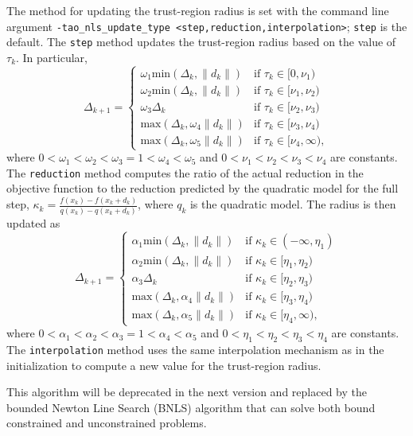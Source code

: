 \documentclass[]{book}
\begin{document}
The method for updating the trust-region radius is set with the 
command line argument 
{\tt -tao\_nls\_update\_type <step,reduction,interpolation>}; {\tt step} 
is the default.  The {\tt step} method updates the trust-region 
radius based on the value of $\tau_k$.  In particular,
\[
\Delta_{k+1} = \left\{\begin{array}{ll}
\omega_1 \mbox{min}(\Delta_k, \|d_k\|) & \mbox{if } \tau_k \in [0, \nu_1) \\
\omega_2 \mbox{min}(\Delta_k, \|d_k\|) & \mbox{if } \tau_k \in [\nu_1, \nu_2) \\
\omega_3 \Delta_k & \mbox{if } \tau_k \in [\nu_2, \nu_3) \\
\mbox{max}(\Delta_k, \omega_4 \|d_k\|) & \mbox{if } \tau_k \in [\nu_3, \nu_4) \\
\mbox{max}(\Delta_k, \omega_5 \|d_k\|) & \mbox{if } \tau_k \in [\nu_4, \infty),
\end{array}
\right.
\]
where $0 < \omega_1 < \omega_2 < \omega_3 = 1 < \omega_4 < \omega_5$ and
$0 < \nu_1 < \nu_2 < \nu_3 < \nu_4$ are constants.  The {\tt reduction} 
method computes the ratio of the actual reduction in the objective function 
to the reduction predicted by the quadratic model for the full step, 
$\kappa_k = \frac{f(x_k) - f(x_k + d_k)}{q(x_k) - q(x_k + d_k)}$, where 
$q_k$ is the quadratic model.  The radius is then updated as
\[
\Delta_{k+1} = \left\{\begin{array}{ll}
\alpha_1 \mbox{min}(\Delta_k, \|d_k\|) & \mbox{if } \kappa_k \in (-\infty, \eta_1) \\
\alpha_2 \mbox{min}(\Delta_k, \|d_k\|) & \mbox{if } \kappa_k \in [\eta_1, \eta_2) \\
\alpha_3 \Delta_k & \mbox{if } \kappa_k \in [\eta_2, \eta_3) \\
\mbox{max}(\Delta_k, \alpha_4 \|d_k\|) & \mbox{if } \kappa_k \in [\eta_3, \eta_4) \\
\mbox{max}(\Delta_k, \alpha_5 \|d_k\|) & \mbox{if } \kappa_k \in [\eta_4, \infty),
\end{array}
\right.
\]
where $0 < \alpha_1 < \alpha_2 < \alpha_3 = 1 < \alpha_4 < \alpha_5$ and
$0 < \eta_1 < \eta_2 < \eta_3 < \eta_4$ are constants.  The {\tt interpolation}
method uses the same interpolation mechanism as in the initialization to
compute a new value for the trust-region radius.

This algorithm will be deprecated in the next version and replaced by the 
bounded Newton Line Search (BNLS) algorithm that can solve both bound constrained 
and unconstrained problems.
\end{document}
